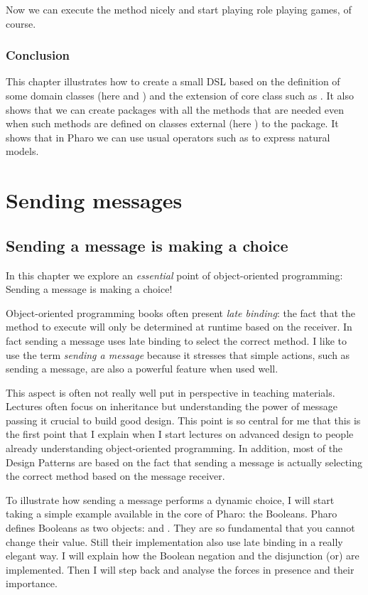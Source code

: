\documentclass[10pt,twoside,english]{_support/latex/sbabook/sbabook}
\begin{document}
Now we can execute the method  nicely and start playing role playing games, of course.
\section{Conclusion}
This chapter illustrates how to create a small DSL based on the definition of some domain classes (here  and  
 ) and the extension of core class such as . It also shows that we can create packages with all the methods that are needed even when such methods are defined on classes external (here ) to the package.  
It shows that in Pharo we can use usual operators such as \textcode{+} to express natural models.
\part{Sending messages}\chapter{Sending a message is making a choice}\label{cha:messages}
In this chapter we explore an \textit{essential} point of object-oriented programming: Sending a message is making a choice! 

Object-oriented programming books often present \textit{late binding}: the fact that the method to execute will only be determined at runtime based on the receiver. In fact sending a message uses late binding to select the correct method. I like to use the term \textit{sending a message} because it stresses that simple
actions, such as sending a message, are also a powerful feature when used well. 

This aspect is often not really well put in perspective in teaching materials. Lectures often focus on inheritance but understanding the power of message passing it crucial to build good design.
This point is so central for me that this is the first point that I explain when I start lectures on advanced design to people already understanding object-oriented programming. In addition, most of
the Design Patterns are based on the fact that sending a message is actually selecting the correct method
based on the message receiver.

To illustrate how sending a message performs a dynamic choice, I will start taking a simple example available in the core of Pharo: the Booleans. Pharo defines Booleans as two objects:  and . They are so fundamental that you cannot change their value. 
Still their implementation also use late binding in a really elegant way. 
 I will explain how the Boolean negation and the disjunction (or) are implemented. Then I will step back and analyse the forces in presence and their importance. 
\end{document}
